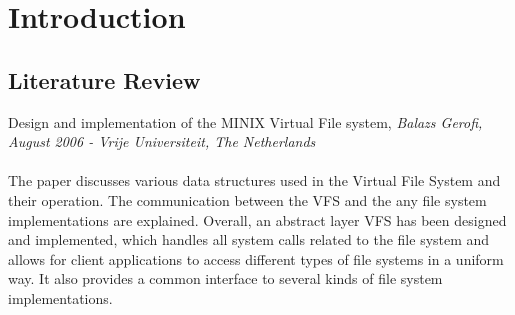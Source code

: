 \chapter{Introduction}

\section{Literature Review}
\vspace{10mm}
 Design and implementation of the MINIX Virtual File system, { \em Balazs Gerofi, August 2006 - Vrije Universiteit, The Netherlands
}\cite{vfs}
\\
\\
The paper discusses various data structures used in the Virtual File System and their operation. The communication between the VFS and the any file system implementations are explained. Overall, an abstract layer VFS has been designed and implemented, which handles all system calls related to the file system and allows for client applications to access different types of file systems in a uniform way. It also provides a common interface to several kinds of file system implementations.





